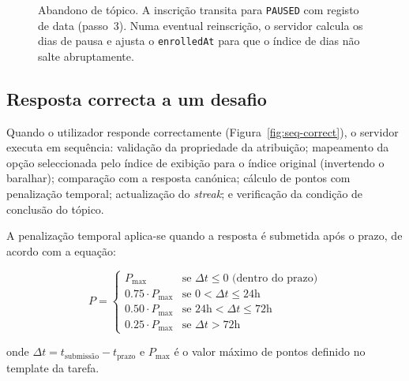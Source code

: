 \begin{figure}[H]
	\caption[Sequ\^encia de abandono de t\'opico]{Abandono de t\'opico. A inscri\c{c}\~ao transita para \texttt{PAUSED} com registo de data (passo~3). Numa eventual reinscrição, o servidor calcula os dias de pausa e ajusta o \texttt{enrolledAt} para que o \'indice de dias n\~ao salte abruptamente.}
	\label{fig:seq-leave}
\end{figure}

\subsection{Resposta correcta a um desafio}
\label{ssec:seq-correct}

Quando o utilizador responde correctamente (Figura~\ref{fig:seq-correct}), o
servidor executa em sequ\^encia: valida\c{c}\~ao da propriedade da atribui\c{c}\~ao;
mapeamento da op\c{c}\~ao seleccionada pelo \'indice de exibi\c{c}\~ao para o
\'indice original (invertendo o baralhar); compara\c{c}\~ao com a resposta
can\'onica; c\'alculo de pontos com penaliza\c{c}\~ao temporal; actualiza\c{c}\~ao
do \emph{streak}; e verifica\c{c}\~ao da condi\c{c}\~ao de conclus\~ao do t\'opico.

A penaliza\c{c}\~ao temporal aplica-se quando a resposta \'e submetida ap\'os o
prazo, de acordo com a equa\c{c}\~ao:

\begin{equation}
	P = \begin{cases}
		P_{\max} & \text{se } \Delta t \leq 0 \text{ (dentro do prazo)} \\
		0.75 \cdot P_{\max} & \text{se } 0 < \Delta t \leq 24\text{h} \\
		0.50 \cdot P_{\max} & \text{se } 24\text{h} < \Delta t \leq 72\text{h} \\
		0.25 \cdot P_{\max} & \text{se } \Delta t > 72\text{h}
	\end{cases}
	\label{eq:penalizacao-temporal}
\end{equation}

onde $\Delta t = t_{\text{submiss\~ao}} - t_{\text{prazo}}$ e $P_{\max}$ \'e
o valor m\'aximo de pontos definido no template da tarefa.

